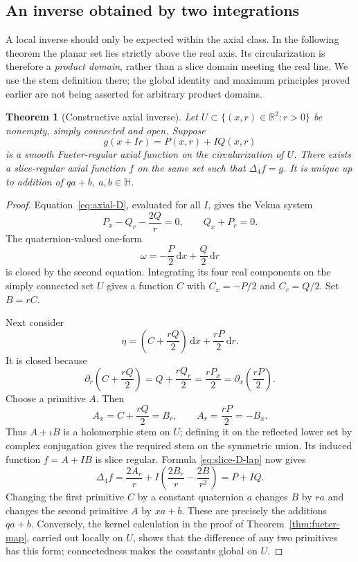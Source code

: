 \documentclass[11pt,a4paper]{article}
\numberwithin{equation}{section}
\newtheorem{theorem}{Theorem}[section]
\theoremstyle{definition}
\theoremstyle{remark}
\newcommand{\R}{\mathbb R}
\newcommand{\HH}{\mathbb H}
\newcommand{\lap}{\Delta_4}
\newcommand{\dd}{\,\mathrm d}
\begin{document}
\subsection{An inverse obtained by two integrations}
A local inverse should only be expected within the axial class. In the
following theorem the planar set lies strictly above the real axis. Its
circularization is therefore a \emph{product domain}, rather than a slice
domain meeting the real line. We use the stem definition there; the global
identity and maximum principles proved earlier are not being asserted for
arbitrary product domains.

\begin{theorem}[Constructive axial inverse]\label{thm:fueter-inverse}
Let $U\subset\{(x,r)\in\R^2:r>0\}$ be nonempty, simply connected and open.
Suppose
\[
 g(x+Ir)=P(x,r)+I Q(x,r)
\]
is a smooth Fueter-regular axial function on the circularization of $U$.
There exists a slice-regular axial function $f$ on the same set such that
$\lap f=g$. It is unique up to addition of $qa+b$, $a,b\in\HH$.
\end{theorem}
\begin{proof}
Equation~\eqref{eq:axial-D}, evaluated for all $I$, gives the Vekua system
\begin{equation}\label{eq:vekua}
 P_x-Q_r-\frac{2Q}{r}=0,\qquad Q_x+P_r=0.
\end{equation}
The quaternion-valued one-form
\begin{equation}\label{eq:inverse-first}
 \omega=-\frac P2\dd x+\frac Q2\dd r
\end{equation}
is closed by the second equation. Integrating its four real components on
the simply connected set $U$ gives a function $C$ with
$C_x=-P/2$ and $C_r=Q/2$. Set $B=rC$.

Next consider
\begin{equation}\label{eq:inverse-second}
 \eta=\left(C+\frac{rQ}{2}\right)\dd x+\frac{rP}{2}\dd r.
\end{equation}
It is closed because
\[
 \partial_r\left(C+\frac{rQ}{2}\right)
 =Q+\frac{rQ_r}{2}
 =\frac{rP_x}{2}
 =\partial_x\left(\frac{rP}{2}\right).
\]
Choose a primitive $A$. Then
\[
 A_x=C+\frac{rQ}{2}=B_r,\qquad
 A_r=\frac{rP}{2}=-B_x.
\]
Thus $A+\iota B$ is a holomorphic stem on $U$; defining it on the reflected
lower set by complex conjugation gives the required stem on the symmetric
union. Its induced function $f=A+IB$ is slice regular. Formula
\eqref{eq:slice-D-lap} now gives
\[
 \lap f=\frac{2A_r}{r}
       +I\left(\frac{2B_r}{r}-\frac{2B}{r^2}\right)=P+IQ.
\]
Changing the first primitive $C$ by a constant quaternion $a$ changes $B$
by $ra$ and changes the second primitive $A$ by $xa+b$. These are precisely
the additions $qa+b$. Conversely, the kernel calculation in the proof of
Theorem~\ref{thm:fueter-map}, carried out locally on $U$, shows that the
difference of any two primitives has this form; connectedness makes the
constants global on $U$.
\end{proof}
\end{document}
